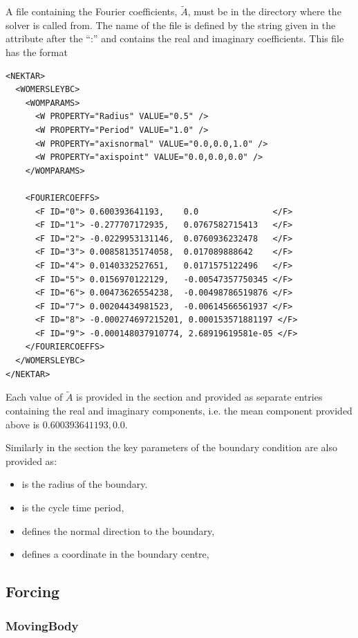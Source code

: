 A file containing the Fourier coefficients, $\tilde{A}$, must be in
the directory where the solver is called from. The name of the file is
defined by the string given in the attribute 
after the ``:'' and contains the real and imaginary coefficients. This
file has the format
\begin{lstlisting}[style=XMLStyle]
<NEKTAR>
  <WOMERSLEYBC>
    <WOMPARAMS>
      <W PROPERTY="Radius" VALUE="0.5" />
      <W PROPERTY="Period" VALUE="1.0" />
      <W PROPERTY="axisnormal" VALUE="0.0,0.0,1.0" />
      <W PROPERTY="axispoint" VALUE="0.0,0.0,0.0" />
    </WOMPARAMS>

    <FOURIERCOEFFS>
      <F ID="0"> 0.600393641193,    0.0               </F>
      <F ID="1"> -0.277707172935,   0.0767582715413   </F>
      <F ID="2"> -0.0229953131146,  0.0760936232478   </F>
      <F ID="3"> 0.00858135174058,  0.017089888642    </F>
      <F ID="4"> 0.0140332527651,   0.0171575122496   </F>
      <F ID="5"> 0.0156970122129,   -0.00547357750345 </F>
      <F ID="6"> 0.00473626554238,  -0.00498786519876 </F>
      <F ID="7"> 0.00204434981523,  -0.00614566561937 </F>
      <F ID="8"> -0.000274697215201, 0.000153571881197 </F>
      <F ID="9"> -0.000148037910774, 2.68919619581e-05 </F>
    </FOURIERCOEFFS>
  </WOMERSLEYBC>
</NEKTAR>
\end{lstlisting}

Each value of $\tilde{A}$ is provided in the 
section and provided as separate entries containing the real and
imaginary components, i.e. the mean component provided above is
$0.600393641193,0.0$.

Similarly in the  section the key parameters of the boundary condition are also provided as:
\begin{itemize}
\item {} is the radius of the boundary.
\item {} is the cycle time period,
\item {} defines the normal direction to the boundary,
\item {}  defines a coordinate in the boundary centre,
\end{itemize}



\subsection{Forcing}
\subsubsection{MovingBody}\label{s:forcing:MovingBody}

